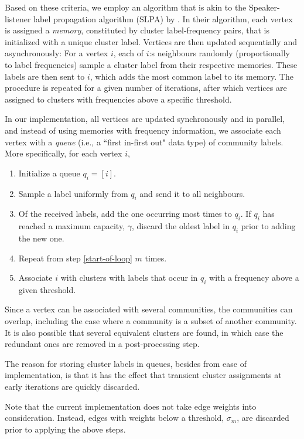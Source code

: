 \documentclass{kais}
\begin{document}
Based on these criteria, we employ an algorithm that is akin to the Speaker-listener
label propagation algorithm (SLPA) by . In their algorithm, each vertex is assigned
a \emph{memory}, constituted by cluster label-frequency pairs, that is initialized with a unique cluster label. Vertices
are then updated sequentially and asynchronously: For a vertex $i$, each of $i$:s neighbours randomly 
(proportionally to label frequencies) sample a cluster label from their respective memories. These labels are then
sent to $i$, which adds the most common label to its memory. The procedure is repeated for a given number of 
iterations, after which vertices are assigned to clusters with frequencies above a specific threshold. 

In our implementation, all vertices are updated synchronously and in parallel, and instead of using
memories with frequency information, we associate each vertex with a \emph{queue} (i.e., a ``first in-first out" data type)
of community labels. More specifically, for each vertex $i$,
\begin{enumerate}
\item Initialize a queue $q_i = [i]$.
\item \label{start-of-loop} Sample a label uniformly from $q_i$ and send it to all neighbours.
\item \label{add-label} Of the received labels, add the one occurring most times to $q_i$. If $q_i$ has reached a maximum 
capacity, $\gamma$, discard the oldest label in $q_i$ prior to adding the new one. 
\item Repeat from step \ref{start-of-loop} $m$ times.
\item Associate $i$ with clusters with labels that occur in $q_i$ with a frequency above a given threshold.
\end{enumerate}
Since a vertex can be associated with several communities, the communities can overlap, including
the case where a community is a subset of another community. It is also possible that several equivalent clusters
are found, in which case the redundant ones are removed in a post-processing step.

The reason for storing cluster labels in queues, besides from ease of implementation, is that it has the effect 
that transient cluster assignments at early iterations are quickly discarded. 

Note that the current implementation does not take edge weights into consideration. Instead, edges with
weights below a threshold, $\sigma_m$, are discarded prior to applying the above steps. 
\end{document}
